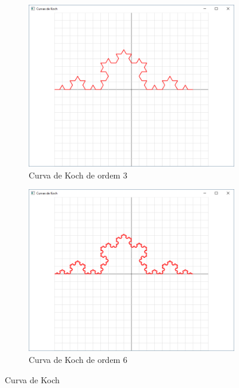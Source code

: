 \begin{enumerate}
\begin{enumerate}
\begin{figure}[!htp]
          \begin{subfigure}[b]{0.4\textwidth}
              \centerline{\includegraphics[width=.9\textwidth]{img/cap4_ex14c}}
              \caption{Curva de Koch de ordem $3$}
              \label{fig:cap03_ex14c}
          \end{subfigure}
          \hfill
          \begin{subfigure}[b]{0.4\textwidth}
              \centerline{\includegraphics[width=.9\textwidth]{img/cap4_ex14d}}
              \caption{Curva de Koch de ordem $6$}
              \label{fig:cap03_ex14d}
          \end{subfigure}
          
          \caption{
            \label{fig:koch}%
            Curva de Koch
          }


\end{figure}
\end{enumerate}
\end{enumerate}
